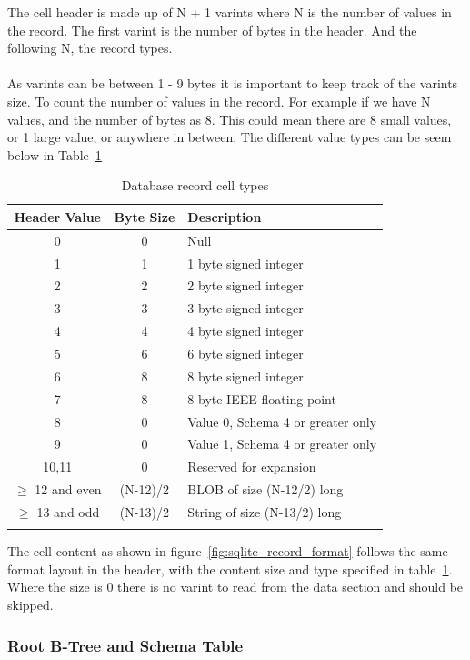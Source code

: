 The cell header is made up of N + 1 varints where N is the number of values in the record. The first varint is the number of bytes in the header. And the following N, the record types.
\\\\
As varints can be between 1 - 9 bytes it is important to keep track of the varints size. To count the number of values in the record. For example if we have N values, and the number of bytes as 8. This could mean there are 8 small values, or 1 large value, or anywhere in between. The different value types can be seem below in Table~\ref{tbl:cell_header_record_types} 

\begin{longtable}[h]{| c | c| p{5cm} |}
		\hline
			\textbf{Header Value} & \textbf{Byte Size} & \textbf{Description} \\ 
		\hline
		\endhead
			0 & 0 & Null \\
		\hline
			1 & 1 & 1 byte signed integer \\
		\hline
			2 & 2 & 2 byte signed integer \\
		\hline
			3 & 3 & 3 byte signed integer \\
		\hline
			4 & 4 & 4 byte signed integer \\
		\hline
			5 & 6 & 6 byte signed integer \\
		\hline
			6 & 8 & 8 byte signed integer \\
		\hline
			7 & 8 & 8 byte IEEE floating point \\
		\hline
			8 & 0 & Value 0, Schema 4 or greater only \\
		\hline
			9 & 0 & Value 1, Schema 4 or greater only \\
		\hline
			10,11 & 0 & Reserved for expansion \\
		\hline
			$\geq$ 12 and even & (N-12)/2 & BLOB of size (N-12/2) long \\
		\hline
			$\geq$ 13 and odd & (N-13)/2 & String of size (N-13/2) long \\
		\hline
	\caption{Database record cell types}
	\label{tbl:cell_header_record_types}
\end{longtable}

The cell content as shown in figure~\ref{fig:sqlite_record_format} follows the same format layout in the header, with the content size and type specified in table~\ref{tbl:cell_header_record_types}. Where the size is 0 there is no varint to read from the data section and should be skipped.

\subsubsection{Root B-Tree and Schema Table}
\label{subsubsec:schema_table}

